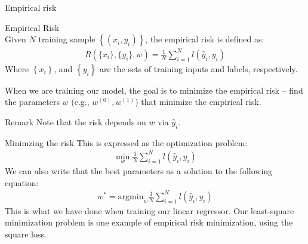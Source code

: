 \begin{parag}{Empirical risk}
	\begin{definition}{Empirical Risk}
		$ $\\
    Given $N$ training sample $\left\{\left(x_i, y_i\right)\right\}$, the empirical risk is defined as:
	\begin{align*} 
		R\left( \{x_i\}, \{y_i\}, w\right) = \frac{1}{N}\sum_{i = 1}^{N}l\left(\hat{y}_i , y_i\right)
	\end{align*}
	Where $\left\{x_i\right\}$, and $\left\{y_i\right\}$ are the sets of training inputs and labels, respectively.
	\end{definition}
	When we are training our model, the goal is to minimize the empirical risk --  find the parameters $w$ (e.g., $w^{\left(0\right)}, w^{\left(1\right)}$) that minimize the empirical risk.
	\begin{subparag}{Remark}
	    Note that the risk depends on $w$ via $\hat{y}_i $.
	\end{subparag}
\end{parag}
\begin{parag}{Minimzing the risk}
    This is expressed as the optimization problem:
	\begin{align*} 
		\min_w \frac{1}{N}\sum_{i= 1}^{N}l\left(\hat{y}_i , y_i\right)
	\end{align*}
	We can also write that the best parameters as a solution to the following equation:
	\begin{align*} 
		w^{\ast}  = \text{argmin}_w \frac{1}{N}\sum_{i = 1}^{N}l\left(\hat{y}_i , y_i\right)
	\end{align*}
	This is what we have done when training our linear regressor. Our least-square minimization problem is one example of empirical risk minimization, using the square loss.
\end{parag}
